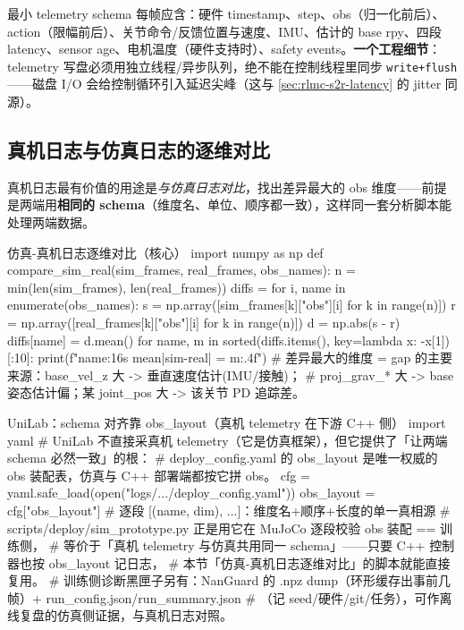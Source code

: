 最小 telemetry schema 每帧应含：硬件 timestamp、step、obs（归一化前后）、action（限幅前后）、关节命令/反馈位置与速度、IMU、估计的 base rpy、四段 latency、sensor age、电机温度（硬件支持时）、safety events。\textbf{一个工程细节}：telemetry 写盘必须用独立线程/异步队列，绝不能在控制线程里同步 \verb|write+flush|——磁盘 I/O 会给控制循环引入延迟尖峰（这与 \cref{sec:rlmc-s2r-latency} 的 jitter 同源）。

\subsection{真机日志与仿真日志的逐维对比}
\label{sec:rlmc-s2r-compare}

真机日志最有价值的用途是\emph{与仿真日志对比}，找出差异最大的 obs 维度——前提是两端用\textbf{相同的 schema}（维度名、单位、顺序都一致），这样同一套分析脚本能处理两端数据。

\begin{codebox}[Python]{仿真-真机日志逐维对比（核心）}
import numpy as np
def compare_sim_real(sim_frames, real_frames, obs_names):
    n = min(len(sim_frames), len(real_frames))
    diffs = {}
    for i, name in enumerate(obs_names):
        s = np.array([sim_frames[k]["obs"][i] for k in range(n)])
        r = np.array([real_frames[k]["obs"][i] for k in range(n)])
        d = np.abs(s - r)
        diffs[name] = d.mean()
    for name, m in sorted(diffs.items(), key=lambda x: -x[1])[:10]:
        print(f"{name:16s} mean|sim-real| = {m:.4f}")
    # 差异最大的维度 = gap 的主要来源：base_vel_z 大 -> 垂直速度估计(IMU/接触)；
    #   proj_grav_* 大 -> base 姿态估计偏；某 joint_pos 大 -> 该关节 PD 追踪差。
\end{codebox}

\begin{codebox}[Python]{UniLab：schema 对齐靠 obs\_layout（真机 telemetry 在下游 C++ 侧）}
import yaml
# UniLab 不直接采真机 telemetry（它是仿真框架），但它提供了「让两端 schema 必然一致」的根：
# deploy_config.yaml 的 obs_layout 是唯一权威的 obs 装配表，仿真与 C++ 部署端都按它拼 obs。
cfg = yaml.safe_load(open("logs/.../deploy_config.yaml"))
obs_layout = cfg["obs_layout"]   # 逐段 [(name, dim), ...]：维度名+顺序+长度的单一真相源
# scripts/deploy/sim_prototype.py 正是用它在 MuJoCo 逐段校验 obs 装配 == 训练侧，
#   等价于「真机 telemetry 与仿真共用同一 schema」——只要 C++ 控制器也按 obs_layout 记日志，
#   本节「仿真-真机日志逐维对比」的脚本就能直接复用。
# 训练侧诊断黑匣子另有：NanGuard 的 .npz dump（环形缓存出事前几帧）+ run_config.json/run_summary.json
#   （记 seed/硬件/git/任务），可作离线复盘的仿真侧证据，与真机日志对照。
\end{codebox}

